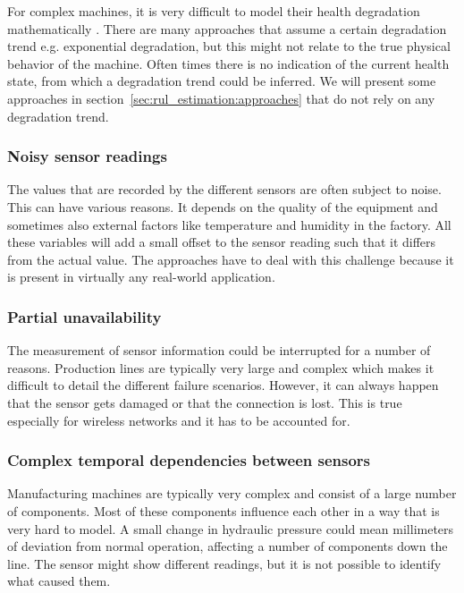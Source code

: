 For complex machines, it is very difficult to model their health degradation mathematically \cite{DBLP:journals/corr/abs-1709-01073}. There are many approaches that assume a certain degradation trend e.g. exponential degradation, but this might not relate to the true physical behavior of the machine. Often times there is no indication of the current health state, from which a degradation trend could be inferred. We will present some approaches in section~\ref{sec:rul_estimation:approaches} that do not rely on any degradation trend.

\subsubsection*{Noisy sensor readings}

The values that are recorded by the different sensors are often subject to noise. This can have various reasons. It depends on the quality of the equipment and sometimes also external factors like temperature and humidity in the factory. All these variables will add a small offset to the sensor reading such that it differs from the actual value. The approaches have to deal with this challenge because it is present in virtually any real-world application.

\subsubsection*{Partial unavailability}

The measurement of sensor information could be interrupted for a number of reasons. Production lines are typically very large and complex which makes it difficult to detail the different failure scenarios. However, it can always happen that the sensor gets damaged or that the connection is lost. This is true especially for wireless networks and it has to be accounted for.

\subsubsection*{Complex temporal dependencies between sensors}

Manufacturing machines are typically very complex and consist of a large number of components. Most of these components influence each other in a way that is very hard to model. A small change in hydraulic pressure could mean millimeters of deviation from normal operation, affecting a number of components down the line. The sensor might show different readings, but it is not possible to identify what caused them.


